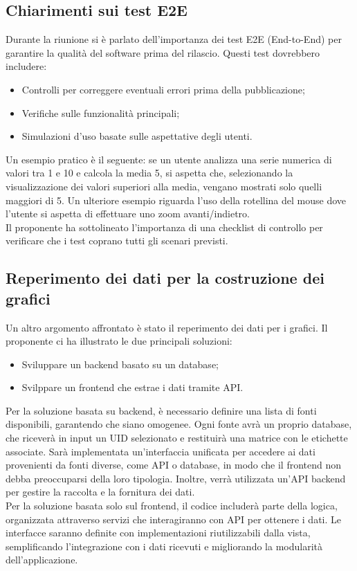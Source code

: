 \subsection{Chiarimenti sui test E2E}
Durante la riunione si è parlato dell'importanza dei test E2E (End-to-End) per garantire la qualità del software prima del rilascio. 
Questi test dovrebbero includere:
\begin{itemize}
    \item Controlli per correggere eventuali errori prima della pubblicazione;
    \item Verifiche sulle funzionalità principali;
    \item Simulazioni d'uso basate sulle aspettative degli utenti.
\end{itemize}
Un esempio pratico è il seguente: se un utente analizza una serie numerica di valori tra 1 e 10 e calcola la media 5, si aspetta che, selezionando la visualizzazione dei valori superiori alla media, vengano mostrati solo quelli maggiori di 5. 
Un ulteriore esempio riguarda l'uso della rotellina del mouse dove l'utente si aspetta di effettuare uno zoom avanti/indietro.
\\Il proponente ha sottolineato l'importanza di una checklist di controllo per verificare che i test coprano tutti gli scenari previsti.

\subsection{Reperimento dei dati per la costruzione dei grafici}
Un altro argomento affrontato è stato il reperimento dei dati per i grafici. 
Il proponente ci ha illustrato le due principali soluzioni:
\begin{itemize}
    \item Sviluppare un backend basato su un database;
    \item Svilppare un frontend che estrae i dati tramite API. 
\end{itemize}
Per la soluzione basata su backend, è necessario definire una lista di fonti disponibili, garantendo che siano omogenee. 
Ogni fonte avrà un proprio database, che riceverà in input un UID selezionato e restituirà una matrice con le etichette associate. 
Sarà implementata un'interfaccia unificata per accedere ai dati provenienti da fonti diverse, come API o database, in modo che il frontend non debba preoccuparsi della loro tipologia. 
Inoltre, verrà utilizzata un'API backend per gestire la raccolta e la fornitura dei dati.
\\
Per la soluzione basata solo sul frontend, il codice includerà parte della logica, organizzata attraverso servizi che interagiranno con API per ottenere i dati. 
Le interfacce saranno definite con implementazioni riutilizzabili dalla vista, semplificando l'integrazione con i dati ricevuti e migliorando la modularità dell'applicazione.

